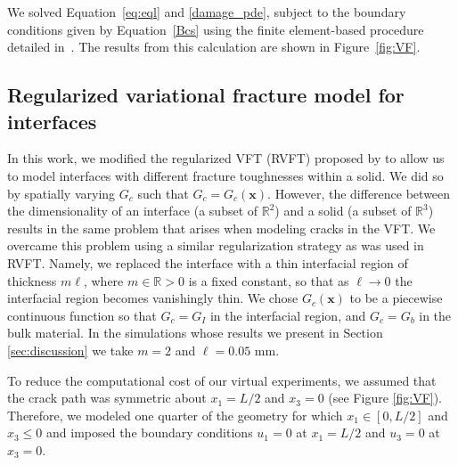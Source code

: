 \documentclass[12pt,onecolumn]{article}
\newcommand{\bs}[1]{\ensuremath{\mathbf{#1}}}
\begin{document}
\begin{bibunit}
We solved Equation~\eqref{eq:eql} and \eqref{damage_pde}, subject to the boundary conditions given by Equation~\eqref{Bcs} using the finite element-based procedure detailed in~\cite{miehe_2010}. The results from this calculation  are shown in Figure~\ref{fig:VF}.

\subsection{Regularized variational fracture model for interfaces}
In this work, we modified the regularized VFT (RVFT) proposed by \cite{bourdin2000numerical} to allow us to model interfaces with different fracture toughnesses within a solid. We did so by spatially varying $G_c$ such that $G_c = G_c(\bs{x})$. However, the difference between the dimensionality of an interface (a subset of $\mathbb{R}^2$) and a solid (a subset of $\mathbb{R}^3$) results in the same problem that arises when modeling cracks in the VFT. We overcame this problem using a similar regularization strategy as was used in RVFT. Namely, we replaced the interface with a thin interfacial region of thickness $m \ell$, where $m\in\mathbb{R}>0$ is a fixed constant, so that as $\ell \to 0$ the interfacial region becomes vanishingly thin. We chose $G_c(\bs{x})$ to be a piecewise continuous function so that $G_c = G_I$ in the interfacial region, and $G_c = G_b$ in the bulk material.  In the simulations whose results we present in Section \ref{sec:discussion} we take $m=2$ and $\ell=0.05$ mm.

To reduce the computational cost of our virtual experiments, we assumed that the crack path was symmetric about $x_1 = L/2$ and $x_3 = 0$ (see Figure \ref{fig:VF}). Therefore, we modeled one quarter of the geometry for which $x_1 \in [0,L/2]$ and $x_3\leq 0$ and imposed the boundary conditions $u_1 = 0$ at $x_1 = L/2$ and $u_3 = 0$ at $x_3 = 0$.





\end{bibunit}
\end{document}
